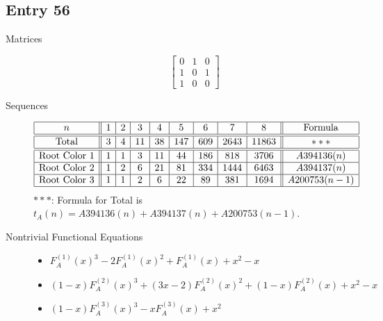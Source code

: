 \documentclass[12pt]{amsart}
\newcommand{\gff}[2]{F_{#2}^{(#1)}(x)}
\newcommand{\gfa}[1]{\gff{#1}{A}}
\begin{document}
\subsection*{Entry 56}
\begin{description}
    \item[Matrices]
    
    \[\begin{bmatrix}
0 & 1 & 0 \\
1 & 0 & 1 \\
1 & 0 & 0
\end{bmatrix}\]
    \item[Sequences]\hspace*{\fill}\vspace{-0.5cm}
    \begin{center}
        \[
        \begin{array}{|c||c|c|c|c|c|c|c|c||c|}\hline
           n  & 1 & 2 & 3 & 4 & 5 & 6 & 7 & 8  & \text{Formula}\\\hline\hline
           \text{Total}  & 3 & 4 & 11 & 38 & 147 & 609 & 2643 & 11863 & ***\\\hline\hline
           \text{Root Color }1 & 1 & 1 & 3 & 11 & 44 & 186 & 818 & 3706 & A394136(n)\\\hline
           \text{Root Color }2 & 1 & 2 & 6 & 21 & 81 & 334 & 1444 & 6463 & A394137(n)\\\hline
           \text{Root Color }3 & 1 & 1 & 2 & 6 & 22 & 89 & 381 & 1694 & A200753(n-1)\\\hline
        \end{array}
        \]
        $***$: Formula for Total is $t_A(n)=A394136(n)+A394137(n)+A200753(n-1)$.
    \end{center}
    
    \item[Nontrivial Functional Equations]\hspace*{\fill}

    \begin{itemize}
\item $\gfa{1}^3-2\gfa{1}^2+\gfa{1}+x^2 - x$


\item $(1 - x)\gfa{2}^3+(3x - 2)\gfa{2}^2+(1 - x)\gfa{2}+x^2 - x$


\item $(1 - x)\gfa{3}^3-x\gfa{3}+x^2$



\end{itemize}
\end{description}
\end{document}
